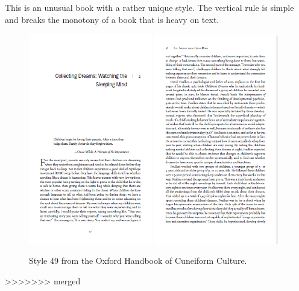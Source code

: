 This is an unusual book with a rather unique style. The vertical rule is simple and breaks the monotony of a book that is heavy on text.
\begin{figure}[ht]
\includegraphics[width=0.48\textwidth]{./chapters/chapter49}\hfill
\includegraphics[width=0.48\textwidth]{./chapters/chapter49a}
\caption{Style 49 from the Oxford Handbook of Cuneiform Culture.}
\end{figure}
>>>>>>> merged
